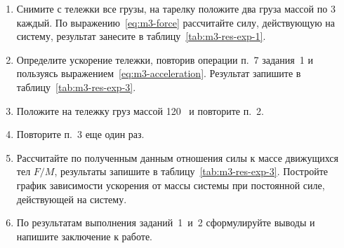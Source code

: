 \documentclass[a4paper, 12pt]{extarticle}
\begin{document}
\begin{enumerate}
\item Снимите с тележки все грузы, на тарелку положите два груза массой по 3~ каждый. По выражению~\eqref{eq:m3-force} рассчитайте силу, действующую на систему, результат занесите в таблицу~\ref{tab:m3-res-exp-1}.
\item Определите ускорение тележки, повторив операции п.~7 задания~1 и пользуясь выражением~\eqref{eq:m3-acceleration}. Результат запишите в таблицу~\ref{tab:m3-res-exp-3}.
\item Положите на тележку груз массой 120~ и повторите п.~2.
\item Повторите п.~3 еще один раз.
\item Рассчитайте по полученным данным отношения силы к массе движущихся тел $F/M$, результаты запишите в таблицу~\ref{tab:m3-res-exp-3}. Постройте график зависимости ускорения от массы системы при постоянной силе, действующей на систему. %
\item По результатам выполнения заданий~1~и~2 сформулируйте выводы и напишите заключение к работе.
\end{enumerate}
\end{document}
